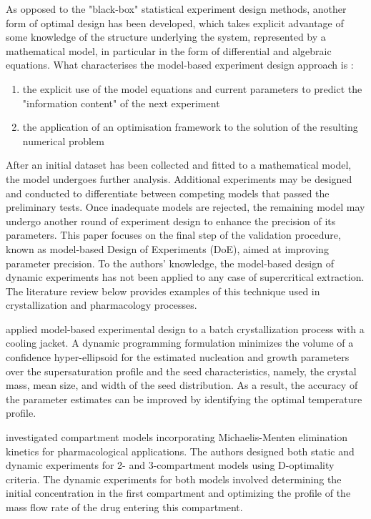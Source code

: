 \documentclass[../Article_Sensitivity_Analsysis.tex]{subfiles}
\begin{document}
	As opposed to the "black-box" statistical experiment design methods, another form of optimal design has been developed, which takes explicit advantage of some knowledge of the structure underlying the system, represented by a mathematical model, in particular in the form of differential and algebraic equations. What characterises the model-based experiment design approach is :
	
	\begin{enumerate}
		\item the explicit use of the model equations and current parameters to predict the "information content" of the next experiment
		\item the application of an optimisation framework to the solution of the resulting numerical problem
	\end{enumerate}
	
	After an initial dataset has been collected and fitted to a mathematical model, the model undergoes further analysis. Additional experiments may be designed and conducted to differentiate between competing models that passed the preliminary tests. Once inadequate models are rejected, the remaining model may undergo another round of experiment design to enhance the precision of its parameters. This paper focuses on the final step of the validation procedure, known as model-based Design of Experiments (DoE), aimed at improving parameter precision. To the authors' knowledge, the model-based design of dynamic experiments has not been applied to any case of supercritical extraction. The literature review below provides examples of this technique used in crystallization and pharmacology processes.
	
	\citet{Chung2000} applied model-based experimental design to a batch crystallization process with a cooling jacket. A dynamic programming formulation minimizes the volume of a confidence hyper-ellipsoid for the estimated nucleation and growth parameters over the supersaturation profile and the seed characteristics, namely, the crystal mass, mean size, and width of the seed distribution. As a result, the accuracy of the parameter estimates can be improved by identifying the optimal temperature profile.
	
	\citet{Duarte2019} investigated compartment models incorporating Michaelis-Menten elimination kinetics for pharmacological applications. The authors designed both static and dynamic experiments for 2- and 3-compartment models using D-optimality criteria. The dynamic experiments for both models involved determining the initial concentration in the first compartment and optimizing the profile of the mass flow rate of the drug entering this compartment.
	
\end{document}
